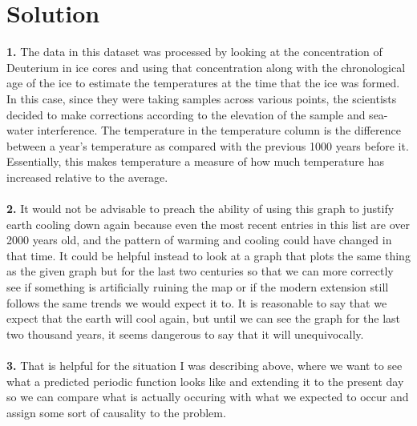 \documentclass[submit]{harvardml}
\newenvironment{solution}
  {\color{blue}\section*{Solution}}
{}
\begin{document}
\newpage
\begin{solution}
	\textbf{1.} The data in this dataset was processed by looking at the concentration 
  of Deuterium in ice cores and using that concentration along with the chronological
  age of the ice to estimate the temperatures at the time that the ice was formed. 
  In this case, since they were taking samples across various points, the scientists 
  decided to make corrections according to the elevation of the sample and sea-water interference.
  The temperature in the temperature column is the difference between a year's temperature as compared 
  with the previous 1000 years before it. Essentially, this makes temperature a measure of how much 
  temperature has increased relative to the average.\\\\

  \textbf{2.} It would not be advisable to preach the ability of using this graph to justify 
  earth cooling down again because even the most recent entries in this list are over 2000 years old, 
  and the pattern of warming and cooling could have changed in that time. It could be helpful instead to 
  look at a graph that plots the same thing as the given graph but for the last two centuries so that we can more correctly 
  see if something is artificially ruining the map or if the modern extension still follows the same trends we 
  would expect it to. It is reasonable to say that we expect that the earth will cool again, but until we can 
  see the graph for the last two thousand years, it seems dangerous to say that it will unequivocally. \\\\

  \textbf{3.} That is helpful for the situation I was describing above, where we want to see what a predicted periodic function looks like
  and extending it to the present day so we can compare what is actually occuring with what
  we expected to occur and assign some sort of causality to the problem. 
\end{solution}
\newpage

\end{document}
